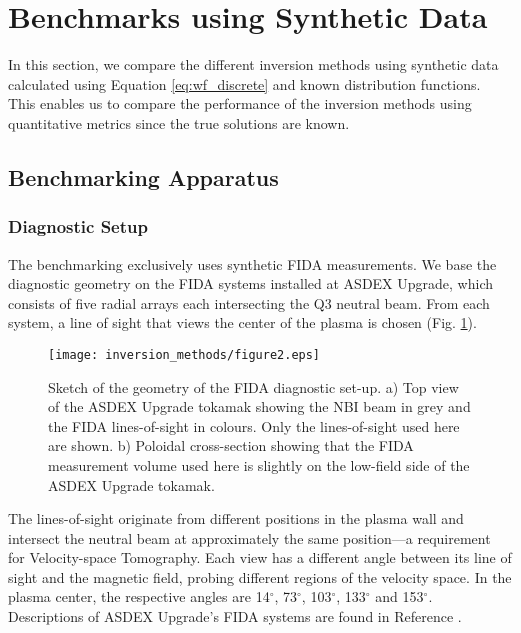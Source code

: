 \section{Benchmarks using Synthetic Data}\label{sec:results_synth}
In this section, we compare the different inversion methods using synthetic data calculated using Equation \ref{eq:wf_discrete} and known distribution functions. This enables us to compare the performance of the inversion methods using quantitative metrics since the true solutions are known.

\subsection{Benchmarking Apparatus}\label{sec:AUG_fida}
\subsubsection{Diagnostic Setup}
The benchmarking exclusively uses synthetic FIDA measurements. We base the diagnostic geometry on the FIDA systems installed at ASDEX Upgrade, which consists of five radial arrays each intersecting the Q3 neutral beam. From each system, a line of sight that views the center of the plasma is chosen (Fig. \ref{fig:FIDA_geometry}). 
\begin{figure}[ht]
    \centering
    \texttt{[image: inversion\_methods/figure2.eps]}
    \caption{Sketch of the geometry of the FIDA diagnostic set-up. a) Top view of the ASDEX Upgrade tokamak showing the NBI beam in grey and the FIDA lines-of-sight in colours. Only the lines-of-sight used here are shown. b) Poloidal cross-section showing that the FIDA measurement volume used here is slightly on the low-field side of the ASDEX Upgrade tokamak.} \label{fig:FIDA_geometry}
\end{figure}
The lines-of-sight originate from different positions in the plasma wall and intersect the neutral beam at approximately the same position---a requirement for Velocity-space Tomography.
Each view has a different angle between its line of sight and the magnetic field, probing different regions of the velocity space\cite{Salewski2014a}. In the plasma center, the respective angles are 14$^\circ$, 73$^\circ$, 103$^\circ$, 133$^\circ$ and 153$^\circ$.
Descriptions of ASDEX Upgrade's FIDA systems are found in Reference \cite{Weiland2015}.

